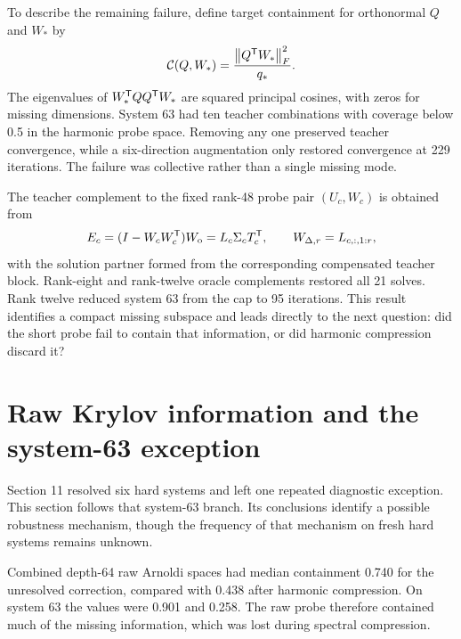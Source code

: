 To describe the remaining failure, define target containment for orthonormal $Q$ and $W_*$ by
\begin{equation}
 \mathcal C(Q,W_*)=\frac{\left\lVert Q^{\mathsf T} W_*\right\rVert_F^2}{q_*}.
 \label{eq:containment}
\end{equation}
The eigenvalues of $W_*^{\mathsf T} QQ^{\mathsf T} W_*$ are squared principal cosines, with zeros for missing dimensions. System 63 had ten teacher combinations with coverage below 0.5 in the harmonic probe space. Removing any one preserved teacher convergence, while a six-direction augmentation only restored convergence at 229 iterations. The failure was collective rather than a single missing mode.

The teacher complement to the fixed rank-48 probe pair $(U_c,W_c)$ is obtained from
\begin{equation}
 E_c=(I-W_cW_c^{\mathsf T})W_{\rm o}=L_c\Sigma_cT_c^{\mathsf T},
 \qquad W_{\Delta,r}=L_{c,:,1:r},
 \label{eq:complementary-target}
\end{equation}
with the solution partner formed from the corresponding compensated teacher block. Rank-eight and rank-twelve oracle complements restored all 21 solves. Rank twelve reduced system 63 from the cap to 95 iterations. This result identifies a compact missing subspace and leads directly to the next question: did the short probe fail to contain that information, or did harmonic compression discard it?

\section{Raw Krylov information and the system-63 exception}
\label{sec:raw-compression}

Section 11 resolved six hard systems and left one repeated diagnostic exception. This section follows that system-63 branch. Its conclusions identify a possible robustness mechanism, though the frequency of that mechanism on fresh hard systems remains unknown.

Combined depth-64 raw Arnoldi spaces had median containment 0.740 for the unresolved correction, compared with 0.438 after harmonic compression. On system 63 the values were 0.901 and 0.258. The raw probe therefore contained much of the missing information, which was lost during spectral compression.

